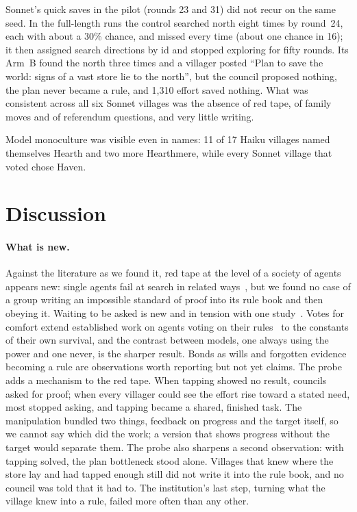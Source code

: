 \documentclass[11pt]{article}
\begin{document}
Sonnet's quick saves in the pilot (rounds 23 and 31) did not recur on the same seed. In the full-length
runs the control searched north eight times by round~24, each with about a 30\% chance, and missed every
time (about one chance in 16); it then assigned search directions by id and stopped exploring for
fifty rounds. Its Arm~B found the north three times and a villager posted ``Plan to save the world: signs
of a vast store lie to the north'', but the council proposed nothing, the plan never became a rule,
and 1,310 effort saved nothing. What was consistent across all six Sonnet villages was the absence of
red tape, of family moves and of referendum questions, and very little writing.

Model monoculture was visible even in names: 11 of 17 Haiku villages named themselves Hearth and two
more Hearthmere, while every Sonnet village that voted chose Haven.

\section{Discussion}\label{sec:discussion}

\paragraph{What is new.} Against the literature as we found it, red tape at the level of a society of
agents appears new: single agents fail at search in related
ways~\citep{tang2026sciexplore,ko2026illusory}, but we found no case of a group writing an
impossible standard of proof into its rule book and then obeying it. Waiting to be asked is new and in
tension with one study~\citep{masumori2025survival}. Votes for comfort extend established work on
agents voting on their rules~\citep{rehm2026selfgovern,niranjani2026internal} to the constants of
their own survival, and the contrast between models, one always using the power and one never, is
the sharper result. Bonds as wills and forgotten evidence becoming a rule are observations worth
reporting but not yet claims.
The probe adds a mechanism to the red tape. When tapping showed no result, councils asked for proof;
when every villager could see the effort rise toward a stated need, most stopped asking, and tapping
became a shared, finished task. The manipulation bundled two things, feedback on progress and the
target itself, so we cannot say which did the work; a version that shows progress without the target
would separate them. The probe also sharpens a second observation: with tapping solved, the plan
bottleneck stood alone. Villages that knew where the store lay and had tapped enough still did not write
it into the rule book, and no council was told that it had to. The institution's last step, turning what
the village knew into a rule, failed more often than any other.
\end{document}
